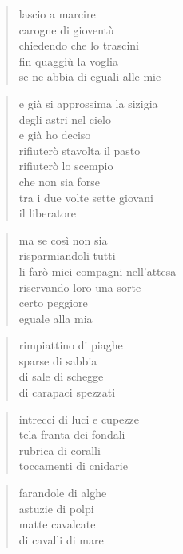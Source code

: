 	\begin{verse}
		lascio a marcire\\
		carogne di gioventù\\
		chiedendo che lo trascini\\
		fin quaggiù la voglia\\
		se ne abbia di eguali alle mie
	\end{verse}

	\begin{verse}
		e già si approssima la sizigia\\
		degli astri nel cielo\\
		e già ho deciso\\
		rifiuterò stavolta il pasto\\
		rifiuterò lo scempio\\
		che non sia forse\\
		tra i due volte sette giovani\\
		il liberatore
	\end{verse}

	\begin{verse}
		ma se così non sia\\
		risparmiandoli tutti\\
		li farò miei compagni nell’attesa\\
		riservando loro una sorte\\
		certo peggiore\\
		eguale alla mia
	\end{verse}

\clearpage


\vspace*{2cm}

	\begin{verse}
		rimpiattino di piaghe\\
		sparse di sabbia\\
		di sale di schegge\\
		di carapaci spezzati
	\end{verse}

	\begin{verse}
		intrecci di luci e cupezze\\
		tela franta dei fondali\\
		rubrica di coralli\\
		toccamenti di cnidarie
	\end{verse}

	\begin{verse}
		farandole di alghe\\
		astuzie di polpi\\
		matte cavalcate\\
		di cavalli di mare
	\end{verse}

